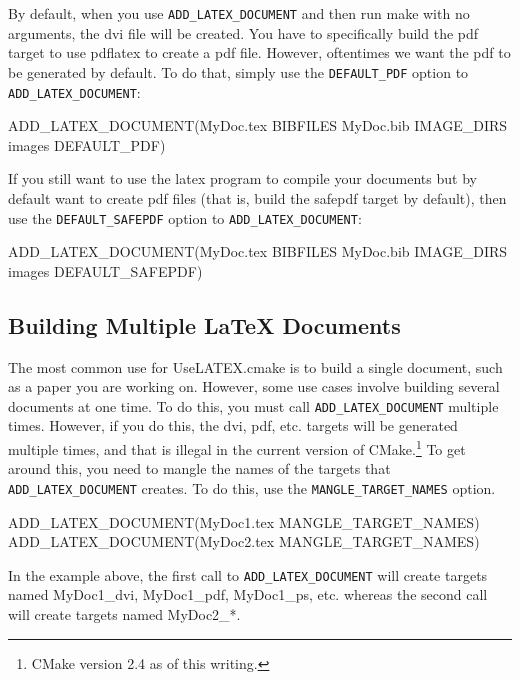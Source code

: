 \documentclass{article}
\newcommand*{\textfile}[1]{\textsf{#1}}
\newcommand*{\textprog}[1]{\textfile{#1}}
\newcommand*{\textcmake}[1]{\texttt{#1}}
\newcommand*{\textmaketarget}[1]{#1}
\newcommand*{\UseLATEX}{\textfile{UseLATEX.cmake}\xspace}
\newcommand*{\latex}{\LaTeX\xspace}
\newcommand*{\ald}{\textcmake{ADD\_LATEX\_DOCUMENT}\xspace}
\begin{document}
  By default, when you use \ald and then run make with no arguments, the
  dvi file will be created. You have to specifically build the pdf target
  to use \textprog{pdflatex} to create a pdf file. However, oftentimes we
  want the pdf to be generated by default. To do that, simply use the
  \textcmake{DEFAULT\_PDF} option to \ald:

  \begin{CodeListing}
ADD_LATEX_DOCUMENT(MyDoc.tex BIBFILES MyDoc.bib
                   IMAGE_DIRS images
		   DEFAULT_PDF)
  \end{CodeListing}

  If you still want to use the \textprog{latex} program to compile your
  documents but by default want to create pdf files (that is, build the
  safepdf target by default), then use the \textcmake{DEFAULT\_SAFEPDF}
  option to \ald:

  \begin{CodeListing}
ADD_LATEX_DOCUMENT(MyDoc.tex BIBFILES MyDoc.bib
                   IMAGE_DIRS images
		   DEFAULT_SAFEPDF)
  \end{CodeListing}

  \subsection{Building Multiple \latex Documents}
  \label{sec:BuldingMultipleLatexDocuments}

  The most common use for \UseLATEX is to build a single document, such as
  a paper you are working on. However, some use cases involve building
  several documents at one time. To do this, you must call \ald multiple
  times. However, if you do this, the dvi, pdf, etc. targets will be
  generated multiple times, and that is illegal in the current version of
  CMake.\footnote{CMake version 2.4 as of this writing.} To get around
  this, you need to mangle the names of the targets that \ald creates. To
  do this, use the \textcmake{MANGLE\_TARGET\_NAMES} option.

  \begin{CodeListing}
ADD_LATEX_DOCUMENT(MyDoc1.tex MANGLE_TARGET_NAMES)
ADD_LATEX_DOCUMENT(MyDoc2.tex MANGLE_TARGET_NAMES)
  \end{CodeListing}

  In the example above, the first call to \ald will create targets named
  \textmaketarget{MyDoc1\_dvi}, \textmaketarget{MyDoc1\_pdf},
  \textmaketarget{MyDoc1\_ps}, etc. whereas the second call will create
  targets named \textmaketarget{MyDoc2\_*}.
\end{document}
